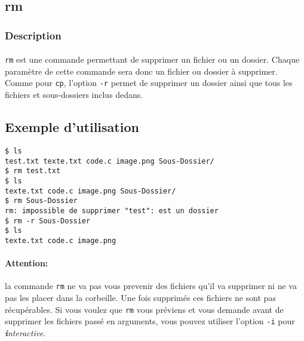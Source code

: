 \subsection{rm}
\subsubsection*{Description}

\paragraph{} \texttt{rm} est une commande permettant de supprimer un fichier ou
un dossier. Chaque paramètre de cette commande sera donc un fichier ou dossier
à supprimer. Comme pour \texttt{cp}, l'option \texttt{-r} permet de supprimer un
dossier ainsi que tous les fichiers et sous-dossiers inclus dedans.

\subsection*{Exemple d'utilisation}

\begin{lstlisting}
$ ls
test.txt texte.txt code.c image.png Sous-Dossier/
$ rm test.txt
$ ls
texte.txt code.c image.png Sous-Dossier/
$ rm Sous-Dossier
rm: impossible de supprimer "test": est un dossier
$ rm -r Sous-Dossier
$ ls
texte.txt code.c image.png
\end{lstlisting}

\paragraph{Attention:} la commande \texttt{rm} ne va pas vous prevenir des
fichiers qu'il va supprimer ni ne va pas les placer dans la corbeille. Une fois
supprimés ces fichiers ne sont pas récupérables. Si vous voulez que \texttt{rm}
vous préviens et vous demande avant de supprimer les fichiers passé en
arguments, vous pouvez utiliser l'option \texttt{-i} pour
\emph{\textbf{i}nteractive}.
